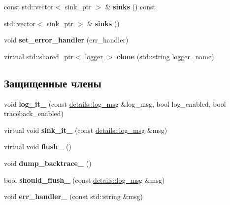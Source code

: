 \begin{DoxyCompactItemize}
const std\+::vector$<$ sink\+\_\+ptr $>$ \& {\bfseries sinks} () const
\item 
\mbox{\label{classspdlog_1_1logger_af119a1643b29610f0db52fb11ba713ba}} 
std\+::vector$<$ sink\+\_\+ptr $>$ \& {\bfseries sinks} ()
\item 
\mbox{\label{classspdlog_1_1logger_ab855ed44bf4807a0441a5e053b5c1ac1}} 
void {\bfseries set\+\_\+error\+\_\+handler} (err\+\_\+handler)
\item 
\mbox{\label{classspdlog_1_1logger_a953200cbe04c2e694d53781c2066a834}} 
virtual std\+::shared\+\_\+ptr$<$ \hyperlink{classspdlog_1_1logger}{logger} $>$ {\bfseries clone} (std\+::string logger\+\_\+name)
\end{DoxyCompactItemize}
\subsection*{Защищенные члены}
\begin{DoxyCompactItemize}
\item 
\mbox{\label{classspdlog_1_1logger_af4f4e7fef776a4443e8e691dca560aec}} 
void {\bfseries log\+\_\+it\+\_\+} (const \hyperlink{structspdlog_1_1details_1_1log__msg}{details\+::log\+\_\+msg} \&log\+\_\+msg, bool log\+\_\+enabled, bool traceback\+\_\+enabled)
\item 
\mbox{\label{classspdlog_1_1logger_a903938d3018e32dedcbd090e624ab5ee}} 
virtual void {\bfseries sink\+\_\+it\+\_\+} (const \hyperlink{structspdlog_1_1details_1_1log__msg}{details\+::log\+\_\+msg} \&msg)
\item 
\mbox{\label{classspdlog_1_1logger_a4410446ddde8880655f00729521e9718}} 
virtual void {\bfseries flush\+\_\+} ()
\item 
\mbox{\label{classspdlog_1_1logger_aec0da766a100f05af1926404d1ce975f}} 
void {\bfseries dump\+\_\+backtrace\+\_\+} ()
\item 
\mbox{\label{classspdlog_1_1logger_ad39bf7f0608d13e335dd19dfce484b36}} 
bool {\bfseries should\+\_\+flush\+\_\+} (const \hyperlink{structspdlog_1_1details_1_1log__msg}{details\+::log\+\_\+msg} \&msg)
\item 
\mbox{\label{classspdlog_1_1logger_a6bd679195d6f128bc60750113608f65c}} 
void {\bfseries err\+\_\+handler\+\_\+} (const std\+::string \&msg)
\end{DoxyCompactItemize}
